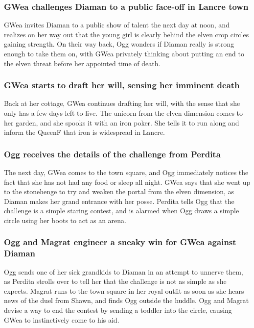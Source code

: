 \subsubsection{\Gls{GWea} challenges \Gls{Diaman} to a public face-off in Lancre town}
\Gls{GWea} invites \Gls{Diaman} to a public show of talent the next day at noon, and realizes on her
way out that the young girl is clearly behind the elven crop circles gaining strength. On their
way back, \Gls{Ogg} wonders if \Gls{Diaman} really is strong enough to take them on, with \Gls{GWea}
privately thinking about putting an end to the elven threat before her appointed time of death.

\subsubsection{\Gls{GWea} starts to draft her will, sensing her imminent death}
Back at her cottage, \Gls{GWea} continues drafting her will, with the sense that she only has a
few days left to live. The unicorn from the elven dimension comes to her garden, and she spooks it
with an iron poker. She tells it to run along and inform the \Gls{QueenF} that iron is widespread
in Lancre.

\subsubsection{\Gls{Ogg} receives the details of the challenge from \Gls{Perdita}}
The next day, \Gls{GWea} comes to the town square, and \Gls{Ogg} immediately notices the fact that
she has not had any food or sleep all night. \Gls{GWea} says that she went up to the stonehenge to
try and weaken the portal from the elven dimension, as \Gls{Diaman} makes her grand entrance with
her posse. \Gls{Perdita} tells \Gls{Ogg} that the challenge is a simple staring contest, and is
alarmed when \Gls{Ogg} draws a simple circle using her boots to act as an arena.

\subsubsection{\Gls{Ogg} and \Gls{Magrat} engineer a sneaky win for \Gls{GWea} against \Gls{Diaman}}
\Gls{Ogg} sends one of her sick grandkids to \Gls{Diaman} in an attempt to unnerve them, as
\Gls{Perdita} strolls over to tell her that the challenge is not as simple as she expects.
\Gls{Magrat} runs to the town square in her royal outfit as soon as she hears news of the duel from
\Gls{Shawn}, and finds \Gls{Ogg} outside the huddle. \Gls{Ogg} and \Gls{Magrat} devise a way to end
the contest by sending a toddler into the circle, causing \Gls{GWea} to instinctively come to his
aid.


